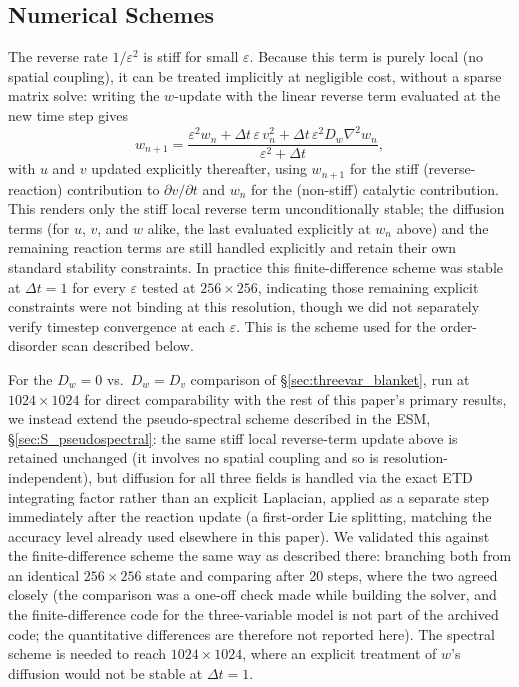 \documentclass[11pt]{article}
\newcommand{\eps}{\varepsilon}
\begin{document}
\subsection{Numerical Schemes}
\label{sec:threevar_numerics}

The reverse rate $1/\eps^2$ is stiff for small $\eps$. Because this term is purely local (no spatial coupling), it can be treated implicitly at negligible cost, without a sparse matrix solve: writing the $w$-update with the linear reverse term evaluated at the new time step gives
\begin{equation}
w_{n+1} = \frac{\eps^2 w_n + \Delta t\, \eps\, v_n^2 + \Delta t\, \eps^2 D_w \nabla^2 w_n}{\eps^2 + \Delta t},
\end{equation}
with $u$ and $v$ updated explicitly thereafter, using $w_{n+1}$ for the stiff (reverse-reaction) contribution to $\partial v/\partial t$ and $w_n$ for the (non-stiff) catalytic contribution. This renders only the stiff local reverse term unconditionally stable; the diffusion terms (for $u$, $v$, and $w$ alike, the last evaluated explicitly at $w_n$ above) and the remaining reaction terms are still handled explicitly and retain their own standard stability constraints. In practice this finite-difference scheme was stable at $\Delta t = 1$ for every $\eps$ tested at $256\times256$, indicating those remaining explicit constraints were not binding at this resolution, though we did not separately verify timestep convergence at each $\eps$. This is the scheme used for the order-disorder scan described below.

For the $D_w=0$ vs.\ $D_w=D_v$ comparison of \S\ref{sec:threevar_blanket}, run at $1024\times1024$ for direct comparability with the rest of this paper's primary results, we instead extend the pseudo-spectral scheme described in the ESM, \S\ref{sec:S_pseudospectral}: the same stiff local reverse-term update above is retained unchanged (it involves no spatial coupling and so is resolution-independent), but diffusion for all three fields is handled via the exact ETD integrating factor rather than an explicit Laplacian, applied as a separate step immediately after the reaction update (a first-order Lie splitting, matching the accuracy level already used elsewhere in this paper). We validated this against the finite-difference scheme the same way as described there: branching both from an identical $256\times256$ state and comparing after 20 steps, where the two agreed closely (the comparison was a one-off check made while building the solver, and the finite-difference code for the three-variable model is not part of the archived code; the quantitative differences are therefore not reported here). The spectral scheme is needed to reach $1024\times1024$, where an explicit treatment of $w$'s diffusion would not be stable at $\Delta t=1$.
\end{document}
